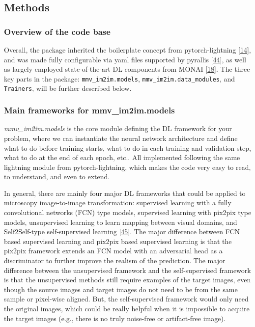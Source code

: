 \hypertarget{methods}{%
\subsection{Methods}\label{methods}}

\hypertarget{overview-of-the-code-base}{%
\subsubsection{Overview of the code base}\label{overview-of-the-code-base}}

Overall, the package inherited the boilerplate concept from pytorch-lightning {[}\protect\hyperlink{ref-YbvSvdyB}{14}{]}, and was made fully configurable via yaml files supported by pyrallis {[}\protect\hyperlink{ref-17WhsEZko}{44}{]}, as well as largely employed state-of-the-art DL components from MONAI {[}\protect\hyperlink{ref-UU62HYC6}{18}{]}. The three key parts in the package: \texttt{mmv\_im2im.models}, \texttt{mmv\_im2im.data\_modules}, and \texttt{Trainers}, will be further described below.

\hypertarget{main-frameworks-for-mmv_im2im.models}{%
\subsubsection{Main frameworks for mmv\_im2im.models}\label{main-frameworks-for-mmv_im2im.models}}

\emph{mmv\_im2im.models} is the core module defining the DL framework for your problem, where we can instantiate the neural network architecture and define what to do before training starts, what to do in each training and validation step, what to do at the end of each epoch, etc.. All implemented following the same lightning module from pytorch-lightning, which makes the code very easy to read, to understand, and even to extend.

In general, there are mainly four major DL frameworks that could be applied to microscopy image-to-image transformation: supervised learning with a fully convolutional networks (FCN) type models, supervised learning with pix2pix type models, unsupervised learning to learn mapping between visual domains, and Self2Self-type self-supervised learning {[}\protect\hyperlink{ref-tuObtXMR}{45}{]}. The major difference between FCN based supervised learning and pix2pix based supervised learning is that the pix2pix framework extends an FCN model with an adversarial head as a discriminator to further improve the realism of the prediction. The major difference between the unsupervised framework and the self-supervised framework is that the unsupervised methods still require examples of the target images, even though the source images and target images do not need to be from the same sample or pixel-wise aligned. But, the self-supervised framework would only need the original images, which could be really helpful when it is impossible to acquire the target images (e.g., there is no truly noise-free or artifact-free image).

